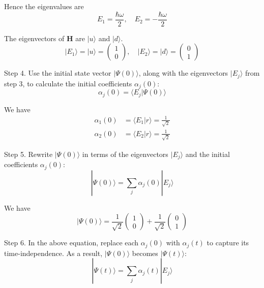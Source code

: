 \documentclass[12pt]{article}
\begin{document}
Hence the eigenvalues are
\begin{equation*}
E_1=\frac{\hbar\omega}{2},
\quad
E_2=-\frac{\hbar\omega}{2}
\end{equation*}

The eigenvectors of $\mathbf H$ are $|u\rangle$ and $|d\rangle$.
\begin{equation*}
|E_1\rangle=|u\rangle=\begin{pmatrix}1\\0\end{pmatrix},
\quad
|E_2\rangle=|d\rangle=\begin{pmatrix}0\\1\end{pmatrix}
\end{equation*}

Step 4.
Use the initial state vector $|\Psi(0)\rangle$,
along with the eigenvectors $|E_j\rangle$ from step 3,
to calculate the initial coefficients $\alpha_j(0)$:
\begin{equation*}
\alpha_j(0)=\langle E_j|\Psi(0)\rangle
\end{equation*}

We have
\begin{align*}
\alpha_1(0)&=\langle E_1|r\rangle=\frac{1}{\sqrt2}
\\[1ex]
\alpha_2(0)&=\langle E_2|r\rangle=\frac{1}{\sqrt2}
\end{align*}

Step 5.
Rewrite $|\Psi(0)\rangle$ in terms of the eigenvectors $|E_j\rangle$ and
the initial coefficients $\alpha_j(0)$:
\begin{equation*}
|\Psi(0)\rangle=\sum_j\alpha_j(0)|E_j\rangle
\end{equation*}

We have
\begin{equation*}
|\Psi(0)\rangle
=\frac{1}{\sqrt2}\begin{pmatrix}1\\0\end{pmatrix}
+\frac{1}{\sqrt2}\begin{pmatrix}0\\1\end{pmatrix}
\end{equation*}

Step 6.
In the above equation, replace each $\alpha_j(0)$ with $\alpha_j(t)$
to capture its time-independence.
As a result, $|\Psi(0)\rangle$ becomes $|\Psi(t)\rangle$:
\begin{equation*}
|\Psi(t)\rangle=\sum_j\alpha_j(t)|E_j\rangle
\end{equation*}
\end{document}
